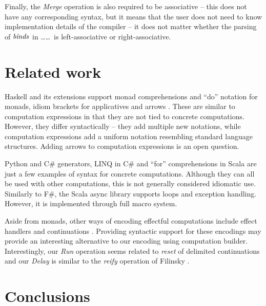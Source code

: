 \documentclass[runningheads,a4paper]{llncs}
\begin{document}
Finally, the \emph{Merge} operation is also required to be associative -- this does not have
any corresponding syntax, but it means that the user does not need to know implementation
details of the compiler -- it does not matter whether the parsing of $\textnormal{\emph{binds}}$ in 
\ldots{}\ldots\ is left-associative or right-associative.


\section{Related work}

Haskell and its extensions support monad comprehensions \cite{monad-compose} and ``do'' notation
for monads, idiom brackets \cite{applicative} for applicatives and arrows \cite{arrows}. 
These are similar to computation expressions in that they are not tied to concrete computations. 
However, they differ syntactically -- they add multiple new notations, while computation expressions 
add a uniform notation resembling standard language structures. Adding arrows to
computation expressions is an open question.

Python and C\# generators, LINQ \cite{linq} in C\# and ``for'' comprehensions 
in Scala are just a few examples of syntax for concrete computations. Although they can all be 
used with other computations, this is not generally considered idiomatic use. Similarly to F\#, 
the Scala async library \cite{scala-async} supports loops and exception handling. However, it is
implemented through full macro system.

Aside from monads, other ways of encoding effectful computations include effect handlers
\cite{effect-handlers} and continuations \cite{monads-layered}. Providing syntactic support for
these encodings may provide an interesting alternative to our encoding using computation builder.
Interestingly, our \emph{Run} operation seems related to \emph{reset} of delimited continuations
\cite{delimcont} and  our \emph{Delay} is similar to the \emph{reify} operation of Filinsky 
\cite{monads-inaction}.




\section{Conclusions}
\label{sec:conclusions}
\end{document}
